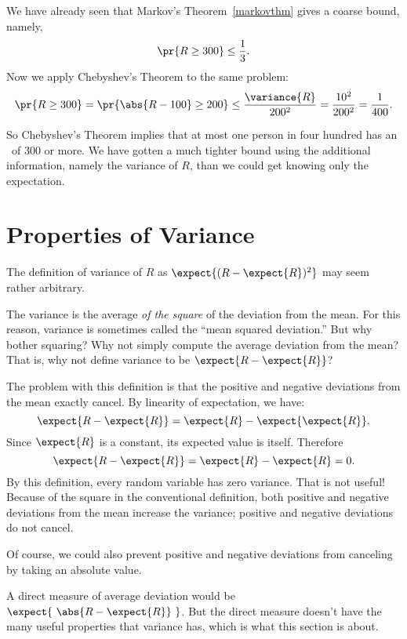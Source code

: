 We have already seen that Markov's Theorem~\ref{markovthm} gives a coarse
bound, namely,
\[
  \pr{R \geq 300} \leq \frac{1}{3}.
\]
Now we apply Chebyshev's Theorem to the same problem:
\[
\pr{R \geq 300} = \pr{\abs{R - 100} \geq 200} \leq
\frac{\variance{R}}{200^2} = \frac{10^2}{200^2} = \frac{1}{400}.
\]
\iffalse
The purpose of the first step is to express the desired probability in the
form required by Chebyshev's Theorem; the equality holds because $R$ is
nonnegative.  Chebyshev's Theorem then yields the inequality.\fi

So Chebyshev's Theorem implies that at most one person in four hundred has
an \IQ\ of 300 or more.  We have gotten a much tighter bound using the
additional information, namely the variance of $R$, than we could get
knowing only the expectation.

\section{Properties of Variance}

The definition of variance of $R$ as $\expect{(R - \expect{R})^2}$ may
seem rather arbitrary.
%
\begin{editingnotes}

The variance is the average \emph{of the square} of the deviation from the
mean.  For this reason, variance is sometimes called the ``mean squared
deviation.''  But why bother squaring?  Why not simply compute the average
deviation from the mean?  That is, why not define variance to be
$\expect{R - \expect{R}}$?

The problem with this definition is that the positive and negative
deviations from the mean exactly cancel.  By linearity of expectation,
we have:
\[
  \expect{R - \expect{R}} = \expect{R} - \expect{\expect{R}}.
\]
Since $\expect{R}$ is a constant, its expected value is itself. Therefore
\[
\expect{R - \expect{R}} = \expect{R} - \expect{R} = 0.
\]
By this definition, every random variable has zero variance.  That is not
useful!  Because of the square in the conventional definition, both
positive and negative deviations from the mean increase the variance;
positive and negative deviations do not cancel.

Of course, we could also prevent positive and negative deviations from
canceling by taking an absolute value.
\end{editingnotes}
%
A direct measure of average deviation would be $\expect{\ \abs{R -
    \expect{R}}\ }$.  But the direct measure doesn't have the many useful
properties that variance has, which is what this section is about.

